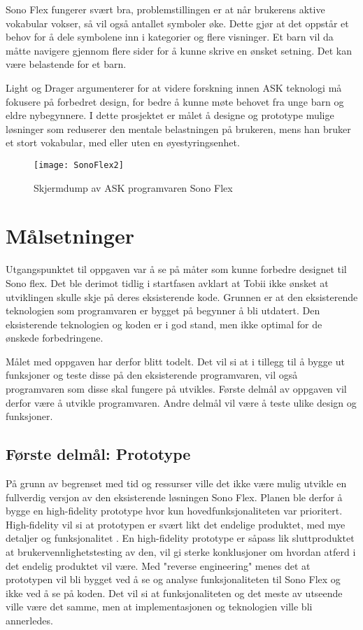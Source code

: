 Sono Flex fungerer svært bra, problemstillingen er at når brukerens aktive vokabular vokser, så vil også antallet symboler øke. Dette gjør at det oppstår et behov for å dele symbolene inn i kategorier og flere visninger. Et barn vil da måtte navigere gjennom flere sider for å kunne skrive en ønsket setning. Det kan være belastende for et barn.

Light og Drager \cite{aac} argumenterer for at videre forskning innen ASK teknologi må fokusere på forbedret design, for bedre å kunne møte behovet fra unge barn og eldre nybegynnere. I dette prosjektet er målet å designe og prototype mulige løsninger som reduserer den mentale belastningen på brukeren, mens han bruker et stort vokabular, med eller uten en øyestyringsenhet. 

\begin{figure}[ht!]
\centering
\texttt{[image: SonoFlex2]}
\caption{Skjermdump av ASK programvaren Sono Flex}
\label{fig:SonoFlex}
\end{figure}


\section{Målsetninger}

Utgangspunktet til oppgaven var å se på måter som kunne forbedre designet til Sono flex. Det ble derimot tidlig i startfasen avklart at Tobii ikke ønsket at utviklingen skulle skje på deres eksisterende kode. Grunnen er at den eksisterende teknologien som programvaren er bygget på begynner å bli utdatert. Den eksisterende teknologien og koden er i god stand, men ikke optimal for de ønskede forbedringene. 

Målet med oppgaven har derfor blitt todelt. Det vil si at i tillegg til å bygge ut funksjoner og teste disse på den eksisterende programvaren, vil også programvaren som disse skal fungere på utvikles. Første delmål av oppgaven vil derfor være å utvikle programvaren. Andre delmål vil være å teste ulike design og funksjoner.

\subsection{Første delmål: Prototype}

På grunn av begrenset med tid og ressurser ville det ikke være mulig  utvikle en fullverdig versjon av den eksisterende løsningen Sono Flex. Planen ble derfor å bygge en high-fidelity prototype hvor kun hovedfunksjonaliteten var prioritert. High-fidelity vil si at prototypen er svært likt det endelige produktet, med mye detaljer og funksjonalitet \cite{Usabi1:online}. En high-fidelity prototype er såpass lik sluttproduktet at brukervennlighetstesting av den, vil gi sterke konklusjoner om hvordan atferd i det endelig produktet vil være. Med "reverse engineering" menes det at prototypen vil bli bygget ved å se og analyse funksjonaliteten til Sono Flex og ikke ved å se på koden. Det vil si at funksjonaliteten og det meste av utseende ville være det samme, men at implementasjonen og teknologien ville bli annerledes.


